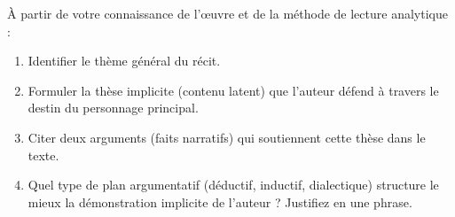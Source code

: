 \documentclass[11pt]{article}
\begin{document}
\begin{exercice}
À partir de votre connaissance de l'œuvre et de la méthode de lecture analytique :
\begin{enumerate}
    \item Identifier le thème général du récit.
    \item Formuler la thèse implicite (contenu latent) que l'auteur défend à travers le destin du personnage principal.
    \item Citer deux arguments (faits narratifs) qui soutiennent cette thèse dans le texte.
    \item Quel type de plan argumentatif (déductif, inductif, dialectique) structure le mieux la démonstration implicite de l'auteur ? Justifiez en une phrase.
\end{enumerate}
\end{exercice}
\end{document}

